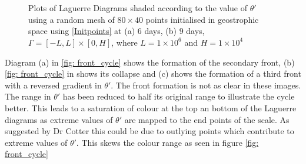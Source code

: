 \begin{figure}[ht!]
	\centering
	\\
	\\
	\caption{Plots of Laguerre Diagrams shaded according to the value of $\theta '$ using a random mesh of $80 \times 40$ points initialised in geostrophic space using \ref{Initpoints} at (a) $6$ days, (b) $9$ days, $\Gamma = [-L,L]\times[0,H]$, where $L = 1\times10^6$ and $H = 1\times10^4$}
	\label{fig: thetap ldiag2}
\end{figure}
\newpage
Diagram (a) in \ref{fig: front_cycle} shows the formation of the secondary front, (b) \ref{fig: front_cycle}  in  shows its collapse and (c) shows the formation of a third front with a reversed gradient in $\theta '$. The front formation is not as clear in these images. The range in $\theta '$ has been reduced to half its original range to illustrate the cycle better. This leads to a saturation of colour at the top an bottom of the Laguerre diagrams as extreme values of $\theta '$ are mapped to the end points of the scale. As suggested by Dr Cotter this could be due to outlying points which contribute to extreme values of $\theta '$. This skews the colour range as seen in figure \ref{fig: front_cycle}
